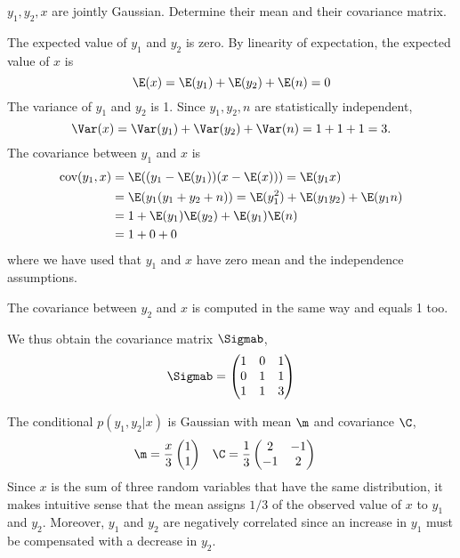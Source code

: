 \begin{exenumerate}

\item $y_1, y_2, x$ are jointly Gaussian. Determine their mean and their
  covariance matrix.

  \begin{solution}
    
    The expected value of $y_1$ and $y_2$ is zero. By linearity of
    expectation, the expected value of $x$ is
    \begin{equation}
      \E(x) = \E(y_1) + \E(y_2) + \E(n) = 0
    \end{equation}
    The variance of $y_1$ and $y_2$ is 1. Since $y_1, y_2, n$ are statistically independent,
    \begin{equation}
      \Var(x) = \Var(y_1) + \Var(y_2) + \Var(n) = 1 + 1 + 1 = 3.
    \end{equation}
    The covariance between $y_1$ and $x$ is
    \begin{align}
      \text{cov}(y_1, x) &= \E( (y_1-\E(y_1))(x-\E(x))) = \E( y_1 x) \\
      &= \E( y_1(y_1+y_2+n) ) = \E(y_1^2) + \E(y_1 y_2) + \E(y_1 n)\\
      &= 1 +  \E(y_1)\E(y_2) + \E(y_1)\E(n)\\
      &= 1 + 0 + 0
    \end{align}
    where we have used that $y_1$ and $x$ have zero mean and the independence assumptions.

    The covariance between $y_2$ and $x$ is computed in the same way and equals 1 too.

    We thus obtain the covariance matrix $\Sigmab$,
    \begin{equation}
      \Sigmab = \begin{pmatrix}
        1 & 0 & 1\\
        0 & 1 & 1\\
        1 & 1 & 3
      \end{pmatrix}
    \end{equation}
    
  \end{solution}

\item The conditional $p(y_1, y_2 | x)$ is Gaussian with mean $\m$ and covariance $\C$,
  \begin{align}
    \m &= \frac{x}{3} \begin{pmatrix}
      1\\
      1
    \end{pmatrix}
    &
    \C & = \frac{1}{3} \begin{pmatrix}
      2 &-1 \\
     -1 & 2
    \end{pmatrix}
  \end{align}
  Since $x$ is the sum of three random variables that have the
  same distribution, it makes intuitive sense that the mean assigns
  $1/3$ of the observed value of $x$ to $y_1$ and $y_2$. Moreover,
  $y_1$ and $y_2$ are negatively correlated since an increase in $y_1$
  must be compensated with a decrease in $y_2$.


\end{exenumerate}
